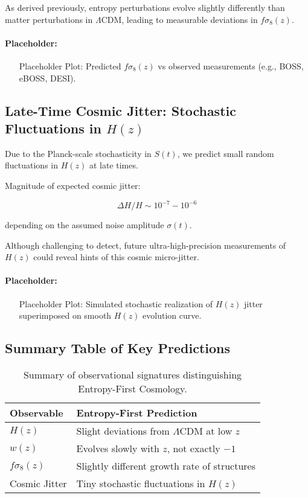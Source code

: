 \documentclass{article}
\begin{document}
As derived previously, entropy perturbations evolve slightly differently than matter perturbations in $\Lambda$CDM, leading to measurable deviations in $f\sigma_8(z)$.

\paragraph{Placeholder:}

\begin{itemize}
    \item [Placeholder] Plot: Predicted $f\sigma_8(z)$ vs observed measurements (e.g., BOSS, eBOSS, DESI).
\end{itemize}



\subsection{Late-Time Cosmic Jitter: Stochastic Fluctuations in $H(z)$}

Due to the Planck-scale stochasticity in $S(t)$, we predict small random fluctuations in $H(z)$ at late times.

Magnitude of expected cosmic jitter:

\[
\Delta H/H \sim 10^{-7} - 10^{-6}
\]

depending on the assumed noise amplitude $\sigma(t)$.

Although challenging to detect, future ultra-high-precision measurements of $H(z)$ could reveal hints of this cosmic micro-jitter.

\paragraph{Placeholder:}

\begin{itemize}
    \item [Placeholder] Plot: Simulated stochastic realization of $H(z)$ jitter superimposed on smooth $H(z)$ evolution curve.
\end{itemize}



\subsection{Summary Table of Key Predictions}

\begin{table}[h]
\centering
\begin{tabular}{|l|l|}
\hline
Observable & Entropy-First Prediction \\ \hline
$H(z)$ & Slight deviations from $\Lambda$CDM at low $z$ \\
$w(z)$ & Evolves slowly with $z$, not exactly $-1$ \\
$f\sigma_8(z)$ & Slightly different growth rate of structures \\
Cosmic Jitter & Tiny stochastic fluctuations in $H(z)$ \\
\hline
\end{tabular}
\caption{Summary of observational signatures distinguishing Entropy-First Cosmology.}
\end{table}
\end{document}
